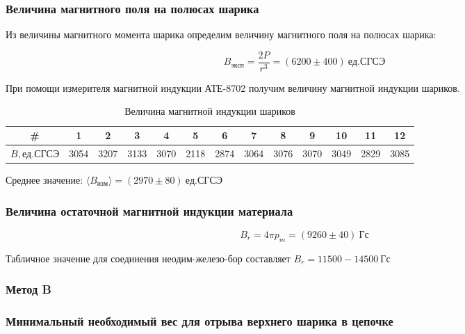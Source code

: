 \documentclass[a4paper, 12pt]{article}
\begin{document}
            \subsubsection{Величина магнитного поля на полюсах шарика}

                Из величины магнитного момента шарика определим величину магнитного поля на полюсах шарика:

                $$
                    B_{эксп} = \frac{2P}{r^3} = (6200 \pm 400)~ед. СГСЭ
                $$

                При помощи измерителя магнитной индукции АТЕ-8702 получим величину магнитной индукции шариков.

                \begin{table}[!ht]
                    \centering
                    \begin{tabular}{|c|c|c|c|c|c|c|c|c|c|c|c|c|}
                        \hline

                        \# & 1 & 2 & 3 & 4 & 5 & 6 & 7 & 8 & 9 & 10 & 11 & 12\\ \hline
                        $B, ед. СГСЭ$ & 3054 & 3207 & 3133 & 3070 & 2118 & 2874 & 3064 & 3076 & 3070 & 3049 & 2829 & 3085\\ \hline

                    \end{tabular}
                    \caption{Величина магнитной индукции шариков}
                    \label{table:B}
                \end{table}

                Среднее значение: $\langle B_{изм} \rangle = (2970 \pm 80)~ед. СГСЭ$

            \subsubsection{Величина остаточной магнитной индукции материала}

                $$
                    B_r = 4 \pi p_m = (9260 \pm 40)~Гс
                $$

                Табличное значение для соединения неодим-железо-бор составляет $B_r = 11500-14500~Гс$

            \subsubsection*{\textbf{Метод B}}
            \subsubsection{Минимальный необходимый вес для отрыва верхнего шарика в цепочке}
\end{document}
